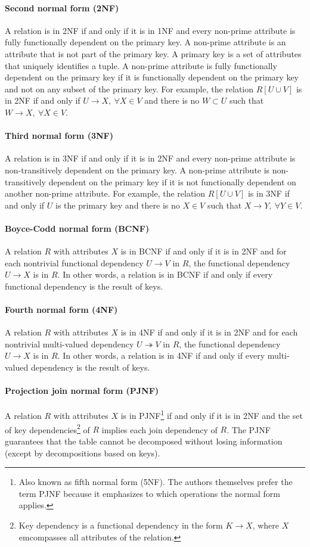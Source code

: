 \paragraph{Second normal form (2NF)}  A relation is in 2NF if and only if it is in 1NF
and every non-prime attribute is fully functionally dependent on the primary key.  A
non-prime attribute is an attribute that is not part of the primary key.  A primary key
is a set of attributes that uniquely identifies a tuple.  A non-prime attribute is fully
functionally dependent on the primary key if it is functionally dependent on the primary
key and not on any subset of the primary key.  For example, the relation $R[U \cup V]$ is
in 2NF if and only if $U \to X,~\forall X \in V$ and there is no $W \subset U$ such that
$W \to X,~\forall X \in V$.

\paragraph{Third normal form (3NF)}  A relation is in 3NF if and only if it is in 2NF
and every non-prime attribute is non-transitively dependent on the primary key.  A
non-prime attribute is non-transitively dependent on the primary key if it is not
functionally dependent on another non-prime attribute.  For example, the relation $R[U
\cup V]$ is in 3NF if and only if $U$ is the primary key and there is no $X \in V$ such
that $X \to Y,~\forall Y \in V$.

\paragraph{Boyce-Codd normal form (BCNF)}  A relation $R$ with attributes $X$ is in BCNF
if and only if it is in 2NF and for each nontrivial functional dependency $U \to V$ in
$R$, the functional dependency $U \to X$ is in $R$.  In other words, a relation is in BCNF
if and only if every functional dependency is the result of keys.

\paragraph{Fourth normal form (4NF)}  A relation $R$ with attributes $X$ is in 4NF if
and only if it is in 2NF and for each nontrivial multi-valued dependency $U \twoheadrightarrow
V$ in $R$, the functional dependency $U \to X$ is in $R$.  In other words, a relation is
in 4NF if and only if every multi-valued dependency is the result of keys.

\paragraph{Projection join normal form (PJNF)} A relation $R$ with attributes $X$ is in
PJNF\footnote{Also known as fifth normal form (5NF).  The authors themselves prefer
the term PJNF because it emphasizes to which operations the normal form applies.}
if and only if it is in 2NF and
the set of key dependencies\footnote{Key dependency is a functional dependency in the form
$K \to X$, where $X$ emcompasses all attributes of the relation.} of $R$ implies each join
dependency of $R$.  The PJNF guarantees that the
table cannot be decomposed without losing information (except by decompositions based on
keys).

